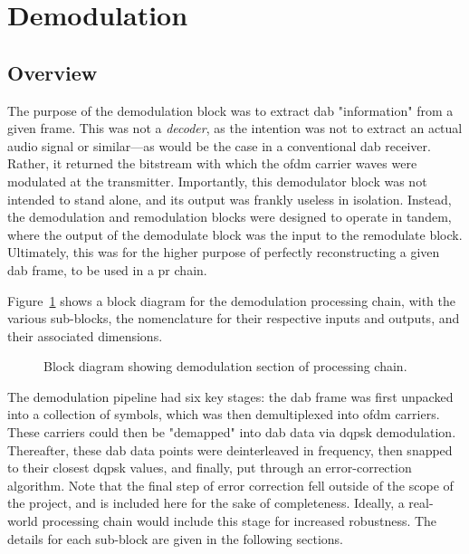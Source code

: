 \documentclass[class=report,11pt,crop=false]{standalone}
\begin{document}
\section{Demodulation \label{sect:dab-proc_demodulate}}
\subsection{Overview}
The purpose of the demodulation block was to extract \gls{dab} "information" from a given frame. This was not a \emph{decoder}, as the intention was not to extract an actual audio signal or similar---as would be the case in a conventional \gls{dab} receiver. Rather, it returned the bitstream with which the \gls{ofdm} carrier waves were modulated at the transmitter. Importantly, this demodulator block was not intended to stand alone, and its output was frankly useless in isolation. Instead, the demodulation and remodulation blocks were designed to operate in tandem, where the output of the demodulate block was the input to the remodulate block. Ultimately, this was for the higher purpose of perfectly reconstructing a given \gls{dab} frame, to be used in a \gls{pr} chain.

Figure~\ref{fig:BD_Demod_All} shows a block diagram for the demodulation processing chain, with the various sub-blocks, the nomenclature for their respective inputs and outputs, and their associated dimensions.

\begin{figure}[htbp]
    \centering
    \captionsetup{type=figure}
    \def\svgwidth{\linewidth}
    { %
        }
    \caption{Block diagram showing demodulation section of processing chain.}
    \label{fig:BD_Demod_All}
\end{figure}

The demodulation pipeline had six key stages: the \gls{dab} frame was first unpacked into a collection of symbols, which was then demultiplexed into \gls{ofdm} carriers. These carriers could then be "demapped" into \gls{dab} data via \gls{dqpsk} demodulation. Thereafter, these \gls{dab} data points were deinterleaved in frequency, then snapped to their closest \gls{dqpsk} values, and finally, put through an error-correction algorithm. Note that the final step of error correction fell outside of the scope of the project, and is included here for the sake of completeness. Ideally, a real-world processing chain would include this stage for increased robustness. The details for each sub-block are given in the following sections.
\end{document}
